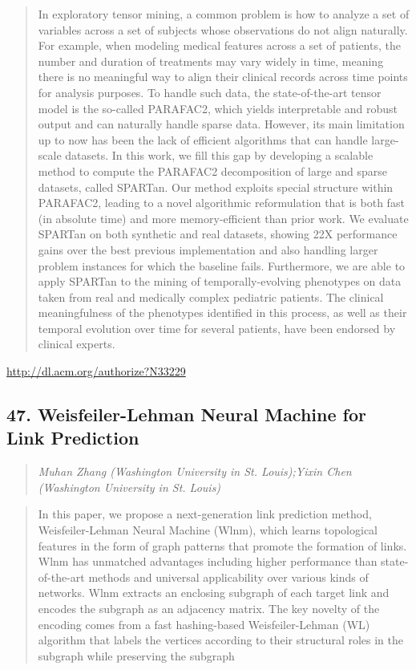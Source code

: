 \documentclass{article}
\begin{document}
\begin{quote}
In exploratory tensor mining, a common problem is how to analyze a set of variables across a set of subjects whose observations do not align naturally. For example, when modeling medical features across a set of patients, the number and duration of treatments may vary widely in time, meaning there is no meaningful way to align their clinical records across time points for analysis purposes. To handle such data, the state-of-the-art tensor model is the so-called PARAFAC2, which yields interpretable and robust output and can naturally handle sparse data. However, its main limitation up to now has been the lack of efficient algorithms that can handle large-scale datasets. In this work, we fill this gap by developing a scalable method to compute the PARAFAC2 decomposition of large and sparse datasets, called SPARTan. Our method exploits special structure within PARAFAC2, leading to a novel algorithmic reformulation that is both fast (in absolute time) and more memory-efficient than prior work. We evaluate SPARTan on both synthetic and real datasets, showing 22X performance gains over the best previous implementation and also handling larger problem instances for which the baseline fails. Furthermore, we are able to apply SPARTan to the mining of temporally-evolving phenotypes on data taken from real and medically complex pediatric patients. The clinical meaningfulness of the phenotypes identified in this process, as well as their temporal evolution over time for several patients, have been endorsed by clinical experts.
\end{quote}

\href{http://dl.acm.org/authorize?N33229}{http://dl.acm.org/authorize?N33229}

\subsection{47. Weisfeiler-Lehman Neural Machine for Link Prediction}

\begin{quote}
\footnotesize{\textit{Muhan Zhang (Washington University in St. Louis);Yixin Chen (Washington University in St. Louis)}}

\end{quote}

\begin{quote}
In this paper, we propose a next-generation link prediction method, Weisfeiler-Lehman Neural Machine (Wlnm), which learns topological features in the form of graph patterns that promote the formation of links. Wlnm has unmatched advantages including higher performance than state-of-the-art methods and universal applicability over various kinds of networks. Wlnm extracts an enclosing subgraph of each target link and encodes the subgraph as an adjacency matrix. The key novelty of the encoding comes from a fast hashing-based Weisfeiler-Lehman (WL) algorithm that labels the vertices according to their structural roles in the subgraph while preserving the subgraph
\end{quote}
\end{document}
